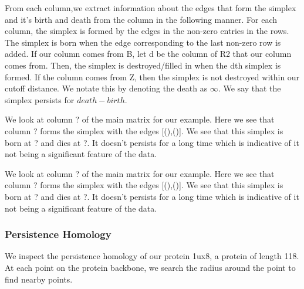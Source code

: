 \documentclass[12pt, a4paper, twocolumn, fullpage]{article}
\theoremstyle{plain}
\theoremstyle{definition}
\theoremstyle{remark}
\begin{document}
From each column,we extract information about the edges that form the simplex and it's birth and death from the column in the following manner. For each column, the simplex is formed by the edges in the non-zero entries in the rows. The simplex is born when the edge corresponding to the last non-zero row is added. If our column comes from B, let d be the column of R2 that our column comes from. Then, the simplex is destroyed/filled in when the dth simplex is formed. If the column comes from Z, then the simplex is not destroyed within our cutoff distance. We notate this by denoting the death as $\infty$. We say that the simplex persists for $death - birth$.

We look at column ? of the main matrix for our example. Here we see that column ? forms the simplex with the edges [(),()]. We see that this simplex is born at ? and dies at ?. It doesn't persists for a long time which is indicative of it not being a significant feature of the data.

We look at column ? of the main matrix for our example. Here we see that column ? forms the simplex with the edges [(),()]. We see that this simplex is born at ? and dies at ?. It doesn't persists for a long time which is indicative of it not being a significant feature of the data.

\subsubsection{Persistence Homology}

We inspect the persistence homology of our protein 1ux8, a protein of length 118. At each point on the protein backbone, we search the radius around the point to find nearby points.
\end{document}
